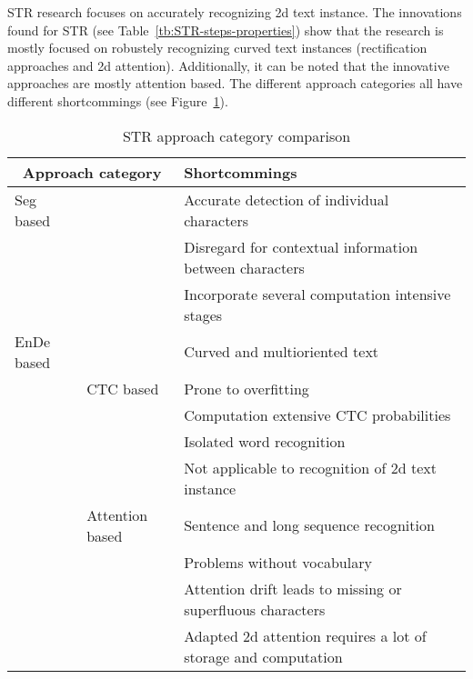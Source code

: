 \ac{STR} research focuses on accurately recognizing 2d text instance.
The innovations found for \ac{STR} (see Table~\ref{tb:STR-steps-properties}) show that the research
is mostly focused on robustely recognizing curved text instances (rectification approaches and
2d attention).
Additionally, it can be noted that the innovative approaches are mostly attention based.
The different approach categories all have different shortcommings (see
Figure~\ref{tb:STR-comparison}).
\begin{table}[h]
    \centering\scriptsize
    \begin{tabular}{p{}p{}p{}}
        \multicolumn{2}{c}{\textbf{Approach category}} & \textbf{Shortcommings} \\
        \toprule
        Seg based & & Accurate detection of individual
                        characters~\citep{chen_text_2021,cheng_aon_2018} \\
        & & Disregard for contextual information between characters~\citep{chen_text_2021} \\
        & & Incorporate several computation intensive stages~\citep{liu_abcnet_2020} \\
        \midrule
        \ac{EnDe} based & & Curved and multioriented text~\citep{cheng_aon_2018, long_scene_2021} \\
        & CTC based & Prone to overfitting~\citep{chen_text_2021} \\
        & & Computation extensive CTC probabilities~\citep{xie_aggregation_2019} \\
        & & Isolated word recognition~\citep{cong_comparative_2019} \\
        & & Not applicable to recognition of 2d text instance~\citep{cheng_focusing_2017,
            xie_aggregation_2019,chen_text_2021} \\
        & Attention based & Sentence and long sequence
            recognition~\citep{cong_comparative_2019,chen_text_2021} \\
        & & Problems without vocabulary~\citep{wan_vocabulary_2020} \\
        & & Attention drift leads to missing or superfluous
            characters~\citep{liao_scene_2018,xie_aggregation_2019,chen_text_2021}\\
        & & Adapted 2d attention requires a lot of storage and
            computation~\citep{xie_aggregation_2019,chen_text_2021} \\
        \bottomrule
    \end{tabular}
    \caption{STR approach category comparison\label{tb:STR-comparison}}
\end{table}
